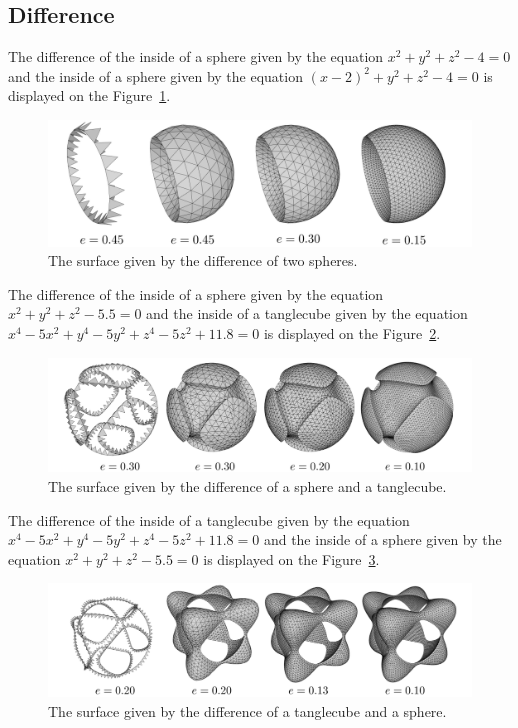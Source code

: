 \subsection{Difference}

The difference of the inside of a sphere given by the equation
$x^2+y^2+z^2-4=0$ and the inside of a sphere given by the 
equation $(x-2)^2+y^2+z^2-4=0$ is displayed on the Figure~\ref{img:80}.
\begin{figure}[h!]
    \centerline{\includegraphics[scale=0.49]{images/img80}}
    \caption[The surface given by the difference of two spheres]
    {The surface given by the difference of two spheres.}
    \label{img:80}
\end{figure}

The difference of the inside of a sphere given by the equation
$x^2+y^2+z^2-5.5=0$ and the inside of a tanglecube given by the 
equation $x^4-5x^2+y^4-5y^2+z^4-5z^2+11.8=0$ is displayed on the Figure~\ref{img:82}.
\begin{figure}[h!]
    \centerline{\includegraphics[scale=0.49]{images/img82}}
    \caption[The surface given by the difference of a sphere and a tanglecube]
    {The surface given by the difference of a sphere and a tanglecube.}
    \label{img:82}
\end{figure}

The difference of the inside of a tanglecube given by the 
equation $x^4-5x^2+y^4-5y^2+z^4-5z^2+11.8=0$ and the inside 
of a sphere given by the equation
$x^2+y^2+z^2-5.5=0$ is displayed on the Figure~\ref{img:83}.
\begin{figure}[h!]
    \centerline{\includegraphics[scale=0.49]{images/img83}}
    \caption[The surface given by the difference of a tanglecube and a sphere]
    {The surface given by the difference of a tanglecube and a sphere.}
    \label{img:83}
\end{figure}


